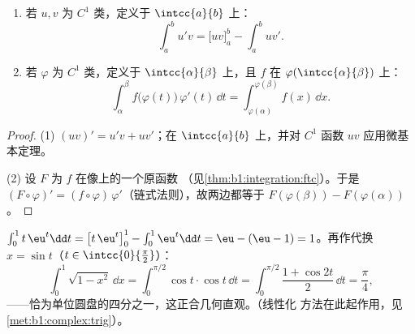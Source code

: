 \begin{theorem}\label{thm:b1:integration:parts}
\begin{enumerate}
  \item 若 $u, v$ 为 $C^1$ 类，定义于 $\intcc{a}{b}$ 上：
        \[
        \int_a^b u'v = \bigl[uv\bigr]_a^b - \int_a^b uv' .
        \]
  \item 若 $\varphi$ 为 $C^1$ 类，定义于 $\intcc{\alpha}{\beta}$ 上，且 $f$
        在 $\varphi(\intcc{\alpha}{\beta})$ 上：
        \[
        \int_{\alpha}^{\beta} f\bigl(\varphi(t)\bigr)\,\varphi'(t)\,
        \dd t = \int_{\varphi(\alpha)}^{\varphi(\beta)} f(x)\, \dd x .
        \]
\end{enumerate}
\end{theorem}

\begin{proof}
(1) $(uv)' = u'v + uv'$；在 $\intcc{a}{b}$ 上，并对
$C^1$ 函数 $uv$ 应用微基本定理。

(2) 设 $F$ 为 $f$ 在像上的一个原函数
（见\cref{thm:b1:integration:ftc}）。于是 $(F \circ \varphi)' = (f
\circ \varphi)\,\varphi'$（链式法则），故两边都等于
$F(\varphi(\beta)) - F(\varphi(\alpha))$。
\end{proof}

\begin{example}\label{ex:b1:integration:parts}
$\int_0^1 t\,\eu^t \dd t = \bigl[t\,\eu^t\bigr]_0^1 - \int_0^1
\eu^t\dd t = \eu - (\eu - 1) = 1$。再作代换 $x =
\sin t$（$t \in \intcc{0}{\frac\pi2}$）：
\[
\int_0^1 \sqrt{1 - x^2}\, \dd x
= \int_0^{\pi/2} \cos t \cdot \cos t \, \dd t
= \int_0^{\pi/2} \frac{1 + \cos 2t}{2}\, \dd t = \frac\pi4 ,
\]
——恰为单位圆盘的四分之一，这正合几何直观。（线性化
方法在此起作用，见\cref{met:b1:complex:trig}）。
\end{example}

